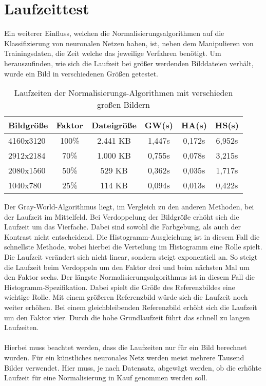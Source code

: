 \section{Laufzeittest}
Ein weiterer Einfluss, welchen die Normalisierungsalgorithmen auf die Klassifizierung von neuronalen Netzen haben, ist, neben dem Manipulieren von Trainingsdaten, die Zeit welche das jeweilige Verfahren benötigt. Um herauszufinden, wie sich die Laufzeit bei größer werdenden Bilddateien verhält, wurde ein Bild in verschiedenen Größen getestet.
\begin{table}
[h]
\caption{Laufzeiten der Normalisierungs-Algorithmen mit verschieden großen Bildern}
\centering
\begin{tabular}{|l|c|c|c|c|c|}
\hline
Bildgröße & Faktor & Dateigröße & GW(s) & HA(s) & HS(s)\\
\hline
4160x3120 & 100\% & 2.441 KB & 1,447s & 0,172s & 6,952s\\
2912x2184 & 70\% & 1.000 KB & 0,755s & 0,078s & 3,215s\\
2080x1560 & 50\% & 529 KB & 0,362s & 0,035s & 1,717s\\
1040x780 & 25\% & 114 KB & 0,094s & 0,013s & 0,422s\\
\hline
\end{tabular}
\end{table}
Der Gray-World-Algorithmus liegt, im Vergleich zu den anderen Methoden, bei der Laufzeit im Mittelfeld. Bei Verdoppelung der Bildgröße erhöht sich die Laufzeit um das Vierfache. Dabei sind sowohl die Farbgebung, als auch der Kontrast nicht entscheidend. Die Histogramm-Ausgleichung ist in diesem Fall die schnellste Methode, wobei hierbei die Verteilung im Histogramm eine Rolle spielt. Die Laufzeit verändert sich nicht linear, sondern steigt exponentiell an. So steigt die Laufzeit beim Verdoppeln um den Faktor drei und beim nächsten Mal um den Faktor sechs. Der längste Normalisierungsalgorithmus ist in diesem Fall die Histogramm-Spezifikation. Dabei spielt die Größe des Referenzbildes eine wichtige Rolle. Mit einem größeren Referenzbild würde sich die Laufzeit noch weiter erhöhen. Bei einem gleichbleibenden Referenzbild erhöht sich die Laufzeit um den Faktor vier. Durch die hohe Grundlaufzeit führt das schnell zu langen Laufzeiten.\\\\
Hierbei muss beachtet werden, dass die Laufzeiten nur für ein Bild berechnet wurden. Für ein künstliches neuronales Netz werden meist mehrere Tausend Bilder verwendet. Hier muss, je nach Datensatz, abgewägt werden, ob die erhöhte Laufzeit für eine Normalisierung in Kauf genommen werden soll.
